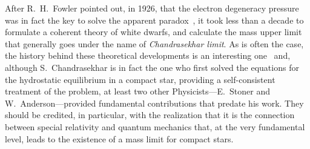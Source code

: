 After R.~H.~Fowler pointed out, in 1926, that the electron degeneracy pressure was
in fact the key to solve the apparent paradox~\cite{1926MNRAS..87..114F}, it took
less than a decade to formulate a coherent theory of white dwarfs, and calculate
the mass upper limit that generally goes under the name of \emph{Chandrasekhar limit}.
As is often the case, the history behind these theoretical developments is an
interesting one~\cite{2008JHA....39..297N} and, although S.~Chandrasekhar is in
fact the one who first solved the equations for the hydrostatic equilibrium in a
compact star, providing a self-consistent treatment of the problem, at least two
other Physicists---E.~Stoner and W.~Anderson---provided
fundamental contributions\cite{1929Stoner,1929ZPhy...56..851A,1930LEDPM...9..944S}
that predate his work. They should be credited, in particular, with the realization
that it is the connection between special relativity and quantum mechanics that,
at the very fundamental level, leads to the existence of a mass limit for compact
stars.

